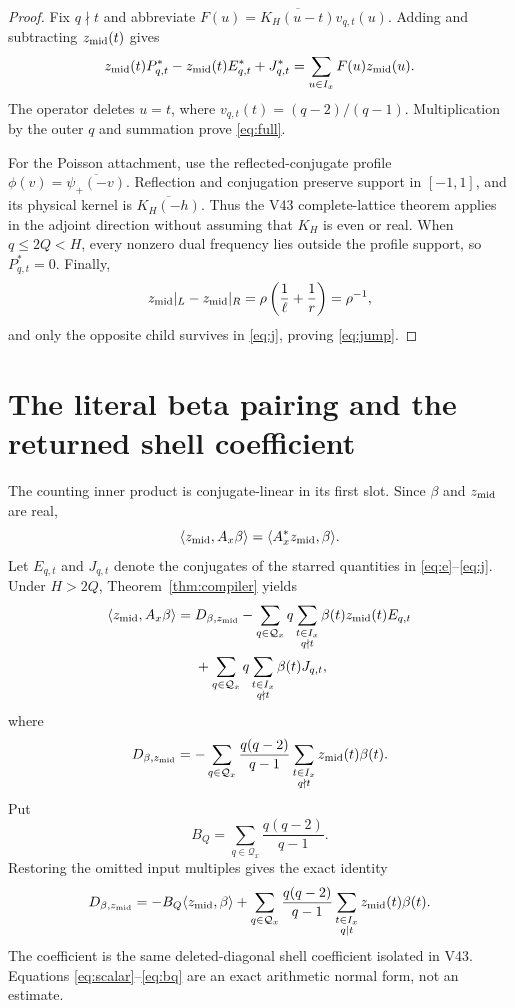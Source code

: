 \documentclass[10pt]{article}
\newcommand{\ip}[2]{\langle #1,#2\rangle}
\newcommand{\zm}{z_{\rm mid}}
\newcommand{\Ax}{A_x}
\newcommand{\Qx}{\mathcal Q_x}
\begin{document}
\begin{proof}
Fix $q\nmid t$ and abbreviate
$F(u)=\overline{K_H(u-t)}v_{q,t}(u)$.  Adding and subtracting $\zm(t)$ gives
\[
 \zm(t)P^*_{q,t}-\zm(t)E^*_{q,t}+J^*_{q,t}
 =\sum_{u\in I_x}F(u)\zm(u).
\]
The operator deletes $u=t$, where
$v_{q,t}(t)=(q-2)/(q-1)$.  Multiplication by the outer $q$ and summation prove
\eqref{eq:full}.

For the Poisson attachment, use the reflected-conjugate profile
$\phi(v)=\overline{\psi_+(-v)}$.  Reflection and conjugation preserve support
in $[-1,1]$, and its physical kernel is $\overline{K_H(-h)}$.  Thus the V43
complete-lattice theorem \cite{v43} applies in the adjoint direction without
assuming that $K_H$ is even or real.  When $q\leq2Q<H$, every nonzero dual
frequency lies outside the profile support, so $P^*_{q,t}=0$.  Finally,
\[
 \zm|_L-\zm|_R=\rho\left(\frac1\ell+\frac1r\right)=\rho^{-1},
\]
and only the opposite child survives in \eqref{eq:j}, proving
\eqref{eq:jump}.
\end{proof}

\section{The literal beta pairing and the returned shell coefficient}

The counting inner product is conjugate-linear in its first slot.  Since
$\beta$ and $\zm$ are real,
\begin{equation}
 \ip{\zm}{\Ax\beta}=\ip{\Ax^*\zm}{\beta}.                       \label{eq:adjoint}
\end{equation}
Let $E_{q,t}$ and $J_{q,t}$ denote the conjugates of the starred quantities in
\eqref{eq:e}--\eqref{eq:j}.  Under $H>2Q$, Theorem~\ref{thm:compiler} yields
\begin{align}
 \ip{\zm}{\Ax\beta}={}&D_{\beta,\zm}
 -\sum_{q\in\Qx}q\sum_{\substack{t\in I_x\\q\nmid t}}
       \beta(t)\zm(t)E_{q,t} \notag\\
 &+\sum_{q\in\Qx}q\sum_{\substack{t\in I_x\\q\nmid t}}
       \beta(t)J_{q,t},                                         \label{eq:scalar}
\end{align}
where
\begin{equation}
 D_{\beta,\zm}=-\sum_{q\in\Qx}\frac{q(q-2)}{q-1}
 \sum_{\substack{t\in I_x\\q\nmid t}}\zm(t)\beta(t).         \label{eq:d}
\end{equation}
Put
\begin{equation}
 B_Q=\sum_{q\in\Qx}\frac{q(q-2)}{q-1}.
\end{equation}
Restoring the omitted input multiples gives the exact identity
\begin{equation}
 D_{\beta,\zm}=-B_Q\ip{\zm}{\beta}
 +\sum_{q\in\Qx}\frac{q(q-2)}{q-1}
   \sum_{\substack{t\in I_x\\q\mid t}}\zm(t)\beta(t).         \label{eq:bq}
\end{equation}
The coefficient is the same deleted-diagonal shell coefficient isolated in
V43.  Equations \eqref{eq:scalar}--\eqref{eq:bq} are an exact arithmetic
normal form, not an estimate.
\end{document}
